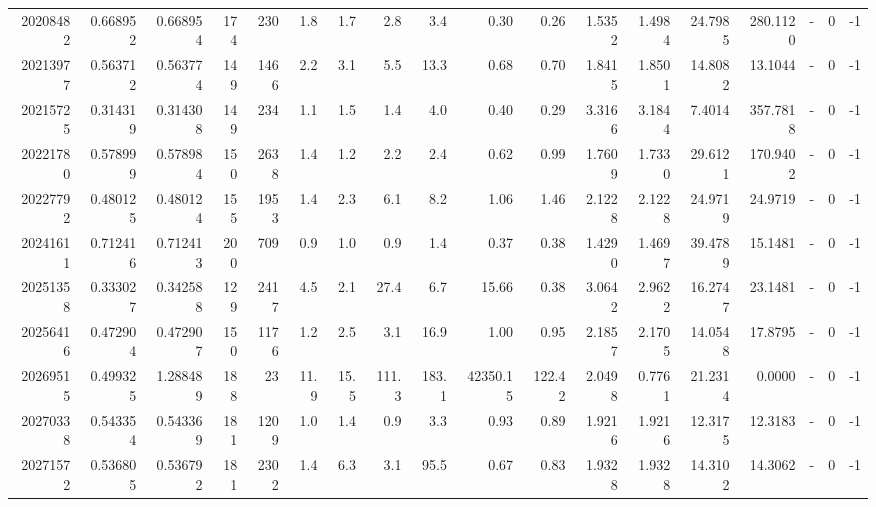 \begin{tabular}{rrrrrrrrrrrrrrrlrr}
  20208482 & 0.668952 &   0.668954 &  174 &  230 &      1.8 &      1.7 &     2.8 &      3.4 &       0.30 &        0.26 &  1.5352 &  1.4984 &   24.7985 &  280.1120 &             - &        0 &         -1 \\
  20213977 & 0.563712 &   0.563774 &  149 & 1466 &      2.2 &      3.1 &     5.5 &     13.3 &       0.68 &        0.70 &  1.8415 &  1.8501 &   14.8082 &   13.1044 &             - &        0 &         -1 \\
  20215725 & 0.314319 &   0.314308 &  149 &  234 &      1.1 &      1.5 &     1.4 &      4.0 &       0.40 &        0.29 &  3.3166 &  3.1844 &    7.4014 &  357.7818 &             - &        0 &         -1 \\
  20221780 & 0.578999 &   0.578984 &  150 & 2638 &      1.4 &      1.2 &     2.2 &      2.4 &       0.62 &        0.99 &  1.7609 &  1.7330 &   29.6121 &  170.9402 &             - &        0 &         -1 \\
  20227792 & 0.480125 &   0.480124 &  155 & 1953 &      1.4 &      2.3 &     6.1 &      8.2 &       1.06 &        1.46 &  2.1228 &  2.1228 &   24.9719 &   24.9719 &             - &        0 &         -1 \\
  20241611 & 0.712416 &   0.712413 &  200 &  709 &      0.9 &      1.0 &     0.9 &      1.4 &       0.37 &        0.38 &  1.4290 &  1.4697 &   39.4789 &   15.1481 &             - &        0 &         -1 \\
  20251358 & 0.333027 &   0.342588 &  129 & 2417 &      4.5 &      2.1 &    27.4 &      6.7 &      15.66 &        0.38 &  3.0642 &  2.9622 &   16.2747 &   23.1481 &             - &        0 &         -1 \\
  20256416 & 0.472904 &   0.472907 &  150 & 1176 &      1.2 &      2.5 &     3.1 &     16.9 &       1.00 &        0.95 &  2.1857 &  2.1705 &   14.0548 &   17.8795 &             - &        0 &         -1 \\
  20269515 & 0.499325 &   1.288489 &  188 &   23 &     11.9 &     15.5 &   111.3 &    183.1 &   42350.15 &      122.42 &  2.0498 &  0.7761 &   21.2314 &    0.0000 &             - &        0 &         -1 \\
  20270338 & 0.543354 &   0.543369 &  181 & 1209 &      1.0 &      1.4 &     0.9 &      3.3 &       0.93 &        0.89 &  1.9216 &  1.9216 &   12.3175 &   12.3183 &             - &        0 &         -1 \\
  20271572 & 0.536805 &   0.536792 &  181 & 2302 &      1.4 &      6.3 &     3.1 &     95.5 &       0.67 &        0.83 &  1.9328 &  1.9328 &   14.3102 &   14.3062 &             - &        0 &         -1 \\

\end{tabular}
